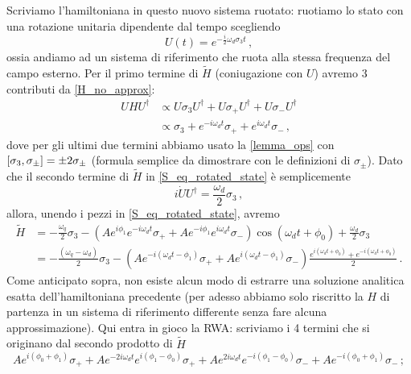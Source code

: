 \noindent Scriviamo l'hamiltoniana in questo nuovo sistema ruotato: ruotiamo lo stato con una rotazione unitaria dipendente dal tempo scegliendo 
\begin{equation*}
    U(t) = e^{-\frac{i}{2} \omega_d \sigma_3 t} \, ,
\end{equation*}
ossia andiamo ad un sistema di riferimento che ruota alla stessa frequenza del campo esterno. Per il primo termine di $\tilde{H}$ (coniugazione con $U$) avremo 3 contributi da \eqref{H_no_approx}:
\begin{align*}
    U H U^\dag &\propto U \sigma_3 U^\dag + U \sigma_+ U^\dag + U \sigma_- U^\dag \\
    &\propto \sigma_3 + e^{-i \omega_d t} \sigma_+ + e^{i \omega_d t} \sigma_- \, ,
\end{align*}
dove per gli ultimi due termini abbiamo usato la \eqref{lemma_ops} con $\comm{\sigma_3}{\sigma_\pm} = \pm 2 \sigma_\pm$ (formula semplice da dimostrare con le definizioni di $\sigma_\pm$). Dato che il secondo termine di $\tilde{H}$ in \eqref{S_eq_rotated_state} è semplicemente
\begin{equation*}
    i \dot{U} U^\dag = \frac{\omega_d}{2} \sigma_3 \, ,
\end{equation*}
allora, unendo i pezzi in \eqref{S_eq_rotated_state}, avremo
\begin{align*}
    \tilde{H} &= - \frac{\omega_q}{2} \sigma_3 - \left( A e^{i \phi_1} e^{-i \omega_d t} \sigma_+ + A e^{-i \phi_1} e^{i \omega_d t} \sigma_- \right) \cos (\omega_d t + \phi_0) + \frac{\omega_d}{2} \sigma_3 \\
    &= -\frac{(\omega_q - \omega_d)}{2} \sigma_3 - \left( A e^{-i (\omega_d t - \phi_1)} \sigma_+ + A e^{i (\omega_d t - \phi_1)} \sigma_- \right) \frac{e^{i(\omega_d t + \phi_0)} + e^{-i(\omega_d t + \phi_0)}}{2} \, .
\end{align*}
Come anticipato sopra, non esiste alcun modo di estrarre una soluzione analitica esatta dell'hamiltoniana precedente (per adesso abbiamo solo riscritto la $H$ di partenza in un sistema di riferimento differente senza fare alcuna approssimazione). Qui entra in gioco la RWA: scriviamo i 4 termini che si originano dal secondo prodotto di $\tilde{H}$
\begin{equation*}
    A e^{i(\phi_0 + \phi_1)} \sigma_+ + A e^{-2i \omega_d t} e^{i(\phi_1 - \phi_0)} \sigma_+ + A e^{2i \omega_d t} e^{-i(\phi_1 - \phi_0)} \sigma_- + A e^{-i(\phi_0 + \phi_1)} \sigma_- \, ;
\end{equation*}
